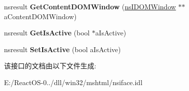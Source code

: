 \begin{DoxyCompactItemize}
nsresult {\bfseries Get\+Content\+D\+O\+M\+Window} (\hyperlink{interfacens_i_d_o_m_window}{ns\+I\+D\+O\+M\+Window} $\ast$$\ast$a\+Content\+D\+O\+M\+Window)
\item 
\mbox{\label{interfacens_i_web_browser_a9bd803ff15518e6712fb96596db4f3a7}} 
nsresult {\bfseries Get\+Is\+Active} (bool $\ast$a\+Is\+Active)
\item 
\mbox{\label{interfacens_i_web_browser_a624f8a28560b159da13b202ac1adc891}} 
nsresult {\bfseries Set\+Is\+Active} (bool a\+Is\+Active)
\end{DoxyCompactItemize}


该接口的文档由以下文件生成\+:\begin{DoxyCompactItemize}
\item 
E\+:/\+React\+O\+S-\/0../dll/win32/mshtml/nsiface.\+idl\end{DoxyCompactItemize}
